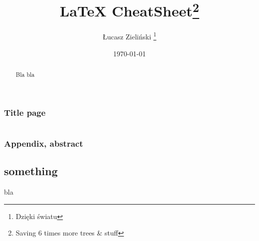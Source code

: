 \subsection{Title page}
\begin{minipage}[t]{0.49\textwidth}
\begin{latex}
\title{\LaTeX{} CheatSheet\footnote{
    Saving 6 times more trees \& stuff}}
\author{\L{}ucasz Zieli\'nski
 \thanks{Dzi\k{e}ki \'swiatu}}
\date{\today}
\begin{titlepage} 
 \maketitle 
\end{titlepage}
\end{latex}
\end{minipage}
\hfill
{}
\hfill
\(\)%

\subsection{Appendix, abstract}
\begin{latex}
\appendix
\chapter{something}
bla

\begin{abstract}
Bla bla
\end{abstract}
\end{latex}

